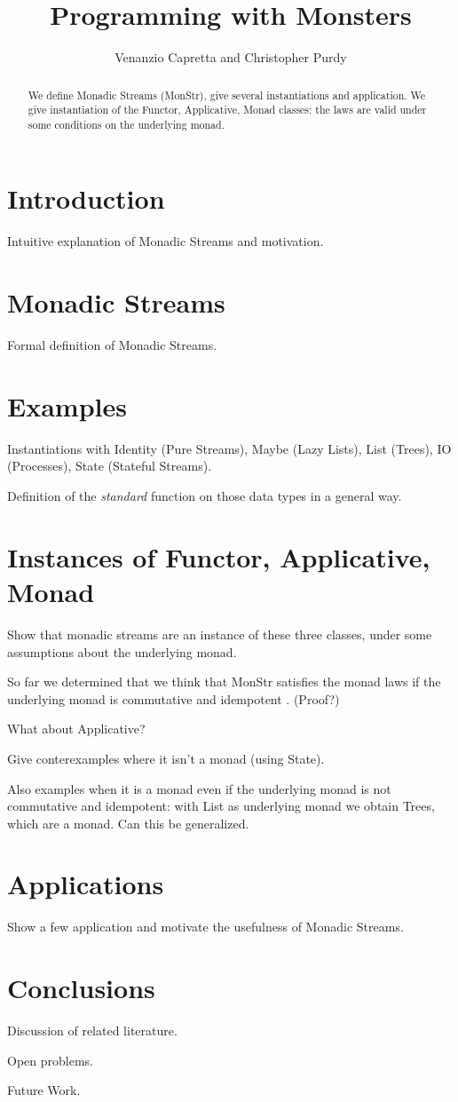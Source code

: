 \documentclass{article}
\title{Programming with Monsters}
\author{Venanzio Capretta and Christopher Purdy}
\begin{document}


\maketitle

\begin{abstract}
We define Monadic Streams (MonStr),
give several instantiations and application.
We give instantiation of the Functor, Applicative, Monad classes: the laws are valid under some conditions on the underlying monad.
\end{abstract}

\section{Introduction}

Intuitive explanation of Monadic Streams and motivation.

\section{Monadic Streams}

Formal definition of Monadic Streams.

\section{Examples}

Instantiations with Identity (Pure Streams), Maybe (Lazy Lists), List (Trees), IO (Processes), State (Stateful Streams).

Definition of the {\em standard} function on those data types in a general way.

\section{Instances of Functor, Applicative, Monad}

Show that monadic streams are an instance of these three classes, under some assumptions about the underlying monad.

So far we determined that we think that MonStr satisfies the monad laws if the underlying monad is commutative and idempotent \cite{idempotent_monads}. (Proof?)

What about Applicative?

Give conterexamples where it isn't a monad (using State).

Also examples when it is a monad even if the underlying monad is not commutative and idempotent: with List as underlying monad we obtain Trees, which are a monad. Can this be generalized.

\section{Applications}

Show a few application and motivate the usefulness of Monadic Streams.

\section{Conclusions}

Discussion of related literature.

Open problems.

Future Work.


\end{document}
